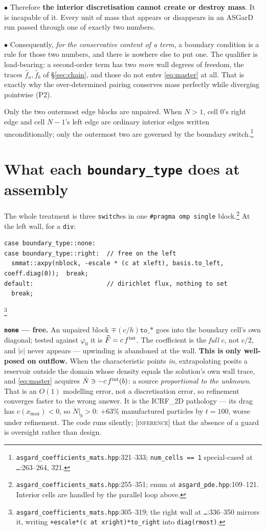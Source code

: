 \documentclass[10pt]{article}
\newcommand{\code}[1]{\texttt{#1}}
\newcommand{\hF}{\widehat{F}}
\newcommand{\hf}{\widehat{f}}
\newcommand{\INF}{\textcolor{red!60!black}{\textsc{[inference]}}}
\newcommand{\fl}[2]{\texttt{#1}:#2}
\begin{document}
$\bullet$ Therefore \textbf{the interior discretisation cannot create or destroy
mass}. It is incapable of it. Every unit of mass that appears or disappears in an
ASGarD run passed through one of exactly two numbers.

$\bullet$ Consequently, \emph{for the conservative content of a term}, a boundary
condition is a rule for those two numbers, and there is nowhere else to put one.
The qualifier is load-bearing: a second-order term has two \emph{more} wall
degrees of freedom, the traces $\hf_a,\hf_b$ of \S\ref{sec:chain}, and those do
not enter \eqref{eq:master} at all. That is exactly why the over-determined
pairing conserves mass perfectly while diverging pointwise (P2).

Only the two outermost edge blocks are unpaired. When $N>1$, cell $0$'s right
edge and cell $N{-}1$'s left edge are ordinary interior edges written
unconditionally; only the outermost two are governed by the boundary
switch.\footnote{\fl{asgard\_coefficients\_mats.hpp}{321--333};
\code{num\_cells == 1} special-cased at \fl{\dots}{263--264, 321}.}

\section{What each \code{boundary\_type} does at assembly}
\label{sec:flags}

The whole treatment is three \code{switch}es in one \code{\#pragma omp single}
block.\footnote{\fl{asgard\_coefficients\_mats.hpp}{255--351}; enum at
\fl{asgard\_pde.hpp}{109--121}. Interior cells are handled by the parallel loop
above.} At the left wall, for a \code{div}:
\begin{lstlisting}
case boundary_type::none:
case boundary_type::right:  // free on the left
  smmat::axpy(nblock, -escale * (c at xleft), basis.to_left, coeff.diag(0));  break;
default:                    // dirichlet flux, nothing to set
  break;
\end{lstlisting}
\vspace{-3mm}\footnote{\fl{asgard\_coefficients\_mats.hpp}{305--319}; the right
wall at \fl{\dots}{336--350} mirrors it, writing
\code{+escale*(c at xright)*to\_right} into \code{diag(rmost)}.}

\textbf{\code{none} --- free.} An unpaired block $\mp(c/h)\code{to\_*}$ goes into
the boundary cell's own diagonal; tested against $\varphi_0$ it is
$\hF=c\,f^{\rm int}$. The coefficient is the \emph{full} $c$, not $c/2$, and
$|c|$ never appears --- upwinding is abandoned at the wall. \textbf{This is only
well-posed on outflow.} When the characteristic points \emph{in}, extrapolating
posits a reservoir outside the domain whose density equals the solution's own
wall trace, and \eqref{eq:master} acquires $\dot N\ni-c\,f^{\rm int}(b)$: a
source \emph{proportional to the unknown}. That is an $O(1)$ modelling error, not
a discretisation error, so refinement converges faster to the wrong answer. It is
the ICRF\_2D pathology --- its drag has $c(x_{\max})<0$, so $\dot N|_b>0$:
$+63\%$ manufactured particles by $t=100$, worse under refinement. The code runs
silently; \INF{} that the absence of a guard is oversight rather than design.
\end{document}
